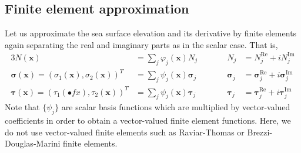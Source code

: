 \documentclass[11pt,a4paper]{article}
\begin{document}
\subsection{Finite element approximation}
Let us approximate the sea surface elevation and its derivative by finite elements again separating the real and imaginary parts as in the scalar case. That is,
\begin{alignat}{3}
N(\mathbf{x})&=\sum_{j}\varphi_j(\mathbf{x})N_j && \qquad N_j&=N_j^\mathrm{Re}+iN_j^\mathrm{Im}\\
\boldsymbol{\sigma}(\mathbf{x})=(\sigma_1(\mathbf{x}),\sigma_2(\mathbf{x}))^T&=\sum_{j}\psi_j(\mathbf{x})\boldsymbol{\sigma}_j && \qquad \boldsymbol{\sigma}_j&=\boldsymbol{\sigma}_j^\mathrm{Re}+i\boldsymbol{\sigma}_j^\mathrm{Im}\\
\boldsymbol{\tau}(\mathbf{x})=(\tau_1(\mathbf{•}f{x}),\tau_2(\mathbf{x}))^T&=\sum_{j}\psi_j(\mathbf{x})\boldsymbol{\tau}_j && \qquad \boldsymbol{\tau}_j&=\boldsymbol{\tau}_j^\mathrm{Re}+i\boldsymbol{\tau}_j^\mathrm{Im}
\end{alignat}
Note that $\{\psi_j\}$ are scalar basis functions which are multiplied by vector-valued coefficients in order to obtain a vector-valued finite element functions. Here, we do not use vector-valued finite elements such as Raviar-Thomas or Brezzi-Douglas-Marini finite elements.
\end{document}
